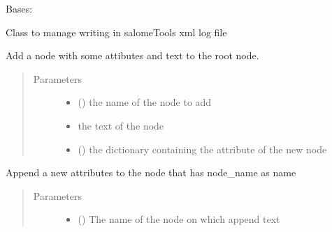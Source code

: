 \documentclass[a4paper,10pt,english]{sphinxmanual}
\begin{document}
\begin{fulllineitems}
\label{\detokenize{commands/apidoc/src:src.xmlManager.XmlLogFile}}
Bases: 

Class to manage writing in salomeTools xml log file

\begin{fulllineitems}
\label{\detokenize{commands/apidoc/src:src.xmlManager.XmlLogFile.add_simple_node}}
Add a node with some attibutes and text to the root node.
\begin{quote}\begin{description}
\item[{Parameters}] \leavevmode\begin{itemize}
\item {} 
 () \textendash{} the name of the node to add

\item {} 
 \textendash{} the text of the node

\item {} 
 () \textendash{} the dictionary containing the 
attribute of the new node

\end{itemize}

\end{description}\end{quote}

\end{fulllineitems}


\begin{fulllineitems}
\label{\detokenize{commands/apidoc/src:src.xmlManager.XmlLogFile.append_node_attrib}}
Append a new attributes to the node that has node\_name as name
\begin{quote}\begin{description}
\item[{Parameters}] \leavevmode\begin{itemize}
\item {} 
 () \textendash{} The name of the node on which append text


\end{itemize}
\end{description}
\end{quote}
\end{fulllineitems}
\end{fulllineitems}
\end{document}
